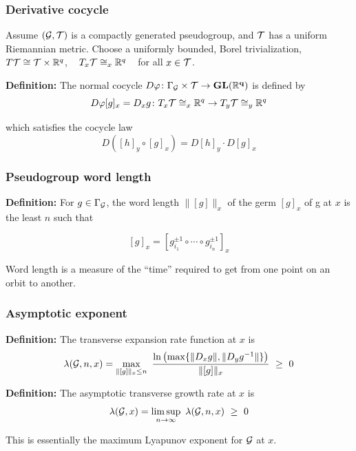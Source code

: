 \documentclass{beamer}
\begin{document}
\frame
{

  \frametitle{Derivative cocycle}
  
  Assume $({\mathcal G}, {\mathcal T})$ is a compactly generated pseudogroup, and ${\mathcal T}$ has a uniform Riemannian metric. Choose a uniformly bounded, Borel trivialization, ~ $T{\mathcal T} \cong {\mathcal T} \times {\mathbb R}^q$,  ~ $T_x{\mathcal T} \cong_x  {\mathbb R}^q$ ~ for all $x \in {\mathcal T}$.
  
  \bigskip
  
  
 {\bf Definition:} The normal cocycle $D\varphi \colon \Gamma_{{\mathcal G}} \times {\mathcal T} \to {\bf GL({\mathbb R}^q)}$ is defined by
 $$D\varphi [g]_x =  D_x g   \colon T_x {\mathcal T} \cong_x {\mathbb R}^q  \to T_{y}{\mathcal T} \cong_y {\mathbb R}^q$$

 which satisfies the  cocycle law 
 $$ D( [h]_y \circ [g]_x ) = D[h]_y \cdot D[g]_x $$
 
 
 \vfill

}


\frame
{

  \frametitle{Pseudogroup  word length}
  

 {\bf Definition:} For $g \in \Gamma_{{\mathcal G}}$,    the word length $\| [g] \|_x$ of the germ $[g]_x$ of g at $x$  is the least $n$ such that 

$$[g]_x = [g_{i_1}^{\pm 1} \circ \cdots \circ g_{i_n}^{\pm 1}]_x$$

Word length is a measure of the ``time'' required to get  from one point on an orbit to another.
  
 \vfill

}



\frame
{

  \frametitle{Asymptotic exponent}
  
   
    {\bf Definition:} The   transverse expansion rate  function at $x$ is
   $$\lambda({\mathcal G}, n, x) =  
   \max_{\| [g] \|_x \leq n} ~  \frac{ \ln \left( \max \{ \| D_x g  \| , \| D_y g^{-1} \|\}\right) }{\| [g] \|_x }~ \geq ~ 0$$


  
 
  \bigskip
   
    {\bf Definition:} The asymptotic transverse growth rate at $x$ is
   $$\lambda({\mathcal G}, x) = \limsup_{n \to \infty} ~ 
 \lambda({\mathcal G}, n, x) ~ \geq ~ 0$$

This is essentially the maximum Lyapunov exponent for ${\mathcal G}$ at $x$.

 \vfill

}
\end{document}
